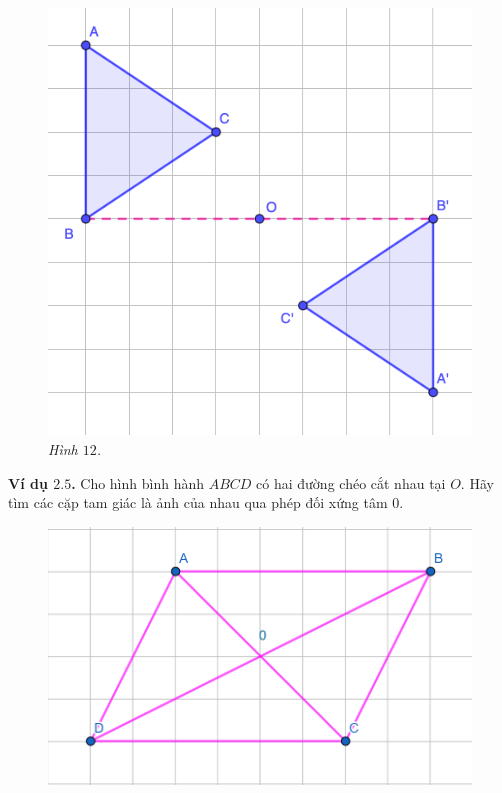 \begin{multicols}{2}
\begin{figure}[H]
		\includegraphics[width= 1\linewidth]{12}
		\caption{\small\textit{\color{toancuabi}Hình $12$.}}
		\vspace*{-10pt}
	\end{figure}
	\textbf{\color{toancuabi}Ví dụ $\pmb{2.5}$.} Cho hình bình hành $ABCD$ có hai đường chéo cắt nhau tại $O$. Hãy tìm các cặp tam giác là ảnh của nhau qua phép đối xứng tâm $0$.
	\begin{figure}[H]
		\vspace*{-5pt}
		\centering
		\captionsetup{labelformat= empty, justification=centering}
		\includegraphics[width= 1\linewidth]{2.5}

\end{figure}
\end{multicols}
